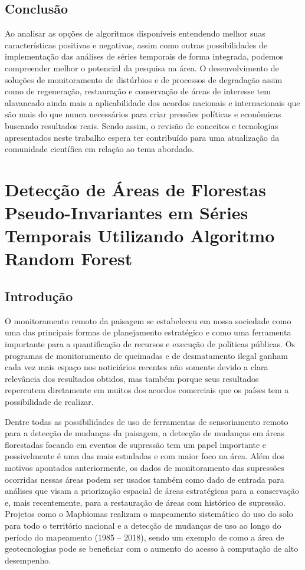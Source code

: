 \documentclass[12pt,a4paper]{article}
\begin{document}
\subsection{Conclusão}
Ao analisar as opções de algoritmos disponíveis entendendo melhor suas características positivas e negativas, assim como outras possibilidades de implementação das análises de séries temporais de forma integrada, podemos compreender melhor o potencial da pesquisa na área. O desenvolvimento de soluções de monitoramento de distúrbios e de processos de degradação assim como de regeneração, restauração e conservação de áreas de interesse tem alavancado ainda mais a aplicabilidade dos acordos nacionais e internacionais que são mais do que nunca necessários para criar pressões políticas e econômicas buscando resultados reais. Sendo assim, o revisão de conceitos e tecnologias apresentados neste trabalho espera ter contribuído para uma atualização da comunidade científica em relação ao tema abordado.

\newpage
\section{Detecção de Áreas de Florestas Pseudo-Invariantes em Séries Temporais Utilizando Algoritmo Random Forest}

\subsection{Introdução}

O monitoramento remoto da paisagem se estabeleceu em nossa sociedade como uma das principais formas de planejamento estratégico e como uma ferramenta importante para a quantificação de recursos e execução de políticas públicas. Os programas de monitoramento de queimadas e de desmatamento ilegal ganham cada vez mais espaço nos noticiários recentes não somente devido a clara relevância dos resultados obtidos, mas também porque seus resultados repercutem diretamente em muitos dos acordos comerciais que os países tem a possibilidade de realizar. 

Dentre todas as possibilidades de uso de ferramentas de sensoriamento remoto para a detecção de mudanças da paisagem, a detecção de mudanças em áreas florestadas focando em eventos de supressão tem um papel importante e possivelmente é uma das mais estudadas e com maior foco na área. Além dos motivos apontados anteriormente, os dados de monitoramento das supressões ocorridas nessas áreas podem ser usados também como dado de entrada para análises que visam a priorização espacial de áreas estratégicas para a conservação e, mais recentemente, para a restauração de áreas com histórico de supressão. Projetos como o Mapbiomas \citep{Souza2019} realizam o mapeamento sistemático do uso do solo para todo o território nacional e a detecção de mudanças de uso ao longo do período do mapeamento (1985 – 2018), sendo um exemplo de como a área de geotecnologias pode se beneficiar com o aumento do acesso à computação de alto desempenho. 
\end{document}

